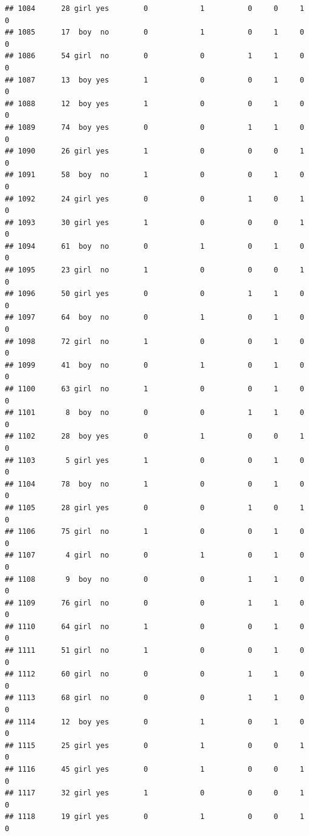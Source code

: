 \documentclass[man]{apa6}
\begin{document}
\begin{verbatim}
## 1084      28 girl yes        0            1          0     0     1     0
## 1085      17  boy  no        0            1          0     1     0     0
## 1086      54 girl  no        0            0          1     1     0     0
## 1087      13  boy yes        1            0          0     1     0     0
## 1088      12  boy yes        1            0          0     1     0     0
## 1089      74  boy yes        0            0          1     1     0     0
## 1090      26 girl yes        1            0          0     0     1     0
## 1091      58  boy  no        1            0          0     1     0     0
## 1092      24 girl yes        0            0          1     0     1     0
## 1093      30 girl yes        1            0          0     0     1     0
## 1094      61  boy  no        0            1          0     1     0     0
## 1095      23 girl  no        1            0          0     0     1     0
## 1096      50 girl yes        0            0          1     1     0     0
## 1097      64  boy  no        0            1          0     1     0     0
## 1098      72 girl  no        1            0          0     1     0     0
## 1099      41  boy  no        0            1          0     1     0     0
## 1100      63 girl  no        1            0          0     1     0     0
## 1101       8  boy  no        0            0          1     1     0     0
## 1102      28  boy yes        0            1          0     0     1     0
## 1103       5 girl yes        1            0          0     1     0     0
## 1104      78  boy  no        1            0          0     1     0     0
## 1105      28 girl yes        0            0          1     0     1     0
## 1106      75 girl  no        1            0          0     1     0     0
## 1107       4 girl  no        0            1          0     1     0     0
## 1108       9  boy  no        0            0          1     1     0     0
## 1109      76 girl  no        0            0          1     1     0     0
## 1110      64 girl  no        1            0          0     1     0     0
## 1111      51 girl  no        1            0          0     1     0     0
## 1112      60 girl  no        0            0          1     1     0     0
## 1113      68 girl  no        0            0          1     1     0     0
## 1114      12  boy yes        0            1          0     1     0     0
## 1115      25 girl yes        0            1          0     0     1     0
## 1116      45 girl yes        0            1          0     0     1     0
## 1117      32 girl yes        1            0          0     0     1     0
## 1118      19 girl yes        0            1          0     0     1     0

\end{verbatim}
\end{document}
